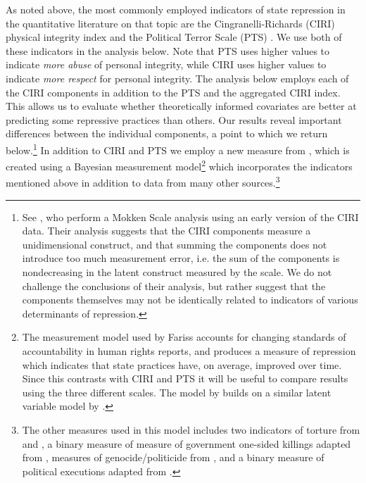 \documentclass[11pt]{article}
\begin{document}
As noted above, the most commonly employed indicators of state repression in the quantitative literature on that topic are the Cingranelli-Richards (CIRI) physical integrity index \citep{CIRI2010} and the Political Terror Scale (PTS) \citep{GibneyCornettWood2009}. We use both of these indicators in the analysis below. Note that PTS uses higher values to indicate {\em more abuse} of personal integrity, while CIRI uses higher values to indicate {\em more respect} for personal integrity. The analysis below employs each of the CIRI components in addition to the PTS and the aggregated CIRI index. This allows us to evaluate whether theoretically informed covariates are better at predicting some repressive practices than others. Our results reveal important differences between the individual components, a point to which we return below.\footnote{See \citet{CingranelliRichards1999isq}, who perform a Mokken Scale analysis using an early version of the CIRI data. Their analysis suggests that the CIRI components measure a unidimensional construct, and that summing the components does not introduce too much measurement error, i.e. the sum of the components is nondecreasing in the latent construct measured by the scale. We do not challenge the conclusions of their analysis, but rather suggest that the components themselves may not be identically related to indicators of various determinants of repression.} In addition to CIRI and PTS we employ a new measure from \citet{Fariss2013}, which is created using a Bayesian measurement model\footnote{The measurement model used by Fariss accounts for changing standards of accountability in human rights reports, and produces a measure of repression which indicates that state practices have, on average, improved over time. Since this contrasts with CIRI and PTS it will be useful to compare results using the three different scales. The model by \citeauthor{Fariss2013} builds on a similar latent variable model by \citet{FarissSchnakenberg2011}.} which incorporates the indicators mentioned above in addition to data from many other sources.\footnote{The other measures used in this model includes two indicators of torture from \citet{Hathaway2002} and \citet{ConradHaglundMoore2012}, a binary measure of measure of government one-sided killings adapted from \citet{EckHultman2007}, measures of genocide/politicide from \citet{HarffGurr1988,Rummel1995,MarshallHarffGurr2009}, and a binary measure of political executions adapted from \citet{TaylorJodice1983}.}
\end{document}
